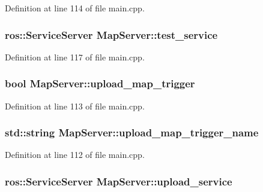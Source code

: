 Definition at line 114 of file main.\-cpp.

\hypertarget{classMapServer_a2f853a0cd5519cae4ad0975bd82b5e43}{
\subsubsection[{test\-\_\-service}]{\setlength{\rightskip}{0pt plus 5cm}ros\-::\-Service\-Server Map\-Server\-::test\-\_\-service\hspace{0.3cm}{\ttfamily [private]}}}\label{classMapServer_a2f853a0cd5519cae4ad0975bd82b5e43}


Definition at line 117 of file main.\-cpp.

\hypertarget{classMapServer_a474607e20044b6f1bd25c82cb26df12c}{
\subsubsection[{upload\-\_\-map\-\_\-trigger}]{\setlength{\rightskip}{0pt plus 5cm}bool Map\-Server\-::upload\-\_\-map\-\_\-trigger\hspace{0.3cm}{\ttfamily [private]}}}\label{classMapServer_a474607e20044b6f1bd25c82cb26df12c}


Definition at line 113 of file main.\-cpp.

\hypertarget{classMapServer_a07c4ad578d29ad41fb12cdb89883c9ad}{
\subsubsection[{upload\-\_\-map\-\_\-trigger\-\_\-name}]{\setlength{\rightskip}{0pt plus 5cm}std\-::string Map\-Server\-::upload\-\_\-map\-\_\-trigger\-\_\-name\hspace{0.3cm}{\ttfamily [private]}}}\label{classMapServer_a07c4ad578d29ad41fb12cdb89883c9ad}


Definition at line 112 of file main.\-cpp.

\hypertarget{classMapServer_a69f6590f7c64f1e2f95f252ec9613406}{
\subsubsection[{upload\-\_\-service}]{\setlength{\rightskip}{0pt plus 5cm}ros\-::\-Service\-Server Map\-Server\-::upload\-\_\-service\hspace{0.3cm}{\ttfamily [private]}}}\label{classMapServer_a69f6590f7c64f1e2f95f252ec9613406}


